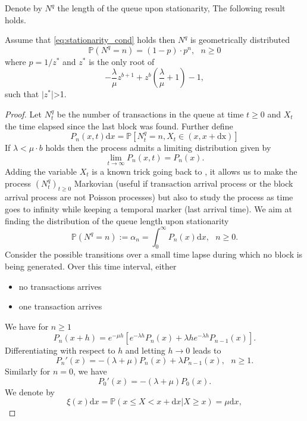 Denote by $N^q$ the length of the queue upon stationarity, The following result holds.
\begin{theo}
Assume that \eqref{eq:stationarity_cond} holds then $N^q$ is geometrically distributed 
$$
\mathbb{P}(N^q = n) = (1-p)\cdot p^n,\text{ } n\geq0
$$
where $p = 1/z^\ast$ and $z^\ast$ is the only root of 
$$
-\frac{\lambda}{\mu}z^{b+1}+z^b\left(\frac{\lambda}{\mu}+1\right) - 1,
$$
such that $|z^\ast$|>1.  
\end{theo}
\begin{proof}
Let $N^q_t$ be the number of transactions in the queue at time $t\geq0$ and $X_t$ the time elapsed since the last block was found. Further define
\[
P_{n}(x,t)\text{d}x  =\mathbb{P}[N_t^q = n, X_t \in(x, x + \text{dx})] 
\]
If $\lambda < \mu\cdot b$ holds then the process admits a limiting distribution given by 
\[
\underset{t\rightarrow\infty}{\lim}P_{n}(x,t) = P_{n}(x).
\]
Adding the variable $X_t$ is a known trick going back to \citet{Cox1955}, it allows us to make the process $(N_t^q)_{t\geq0}$ Markovian (useful if transaction arrival process or the block arrival process are not Poisson processes) but also to study the process as time goes to infinity while keeping a temporal marker (last arrival time). We aim at finding the distribution of the queue length upon stationarity
\begin{equation}\label{eq:alpha_n}
\mathbb{P}(N^q=n):=\alpha_n =\int_{0}^\infty P_{n}(x)\text{d}x, \text{ }n\geq0.
\end{equation}
Consider the possible transitions over a small time lapse  during which no block is being generated. Over this time interval, either 
\begin{itemize}
  \item no transactions arrives
  \item one transaction arrives
\end{itemize}
We have for $n\geq1$
\[
P_{n}(x+h) = e^{-\mu h}\left[e^{-\lambda h}P_{n}(x)+\lambda h e^{-\lambda h}P_{n-1}(x)\right].
\]
Differentiating with respect to $h$ and letting $h\rightarrow0$ leads to 
\begin{equation}\label{eq:diff_eq_n_geq_1}
P_{n}'(x) = -(\lambda+\mu)P_{n}(x)+\lambda P_{n-1}(x),\text{ }n \geq1.
\end{equation}
Similarly for $n = 0$, we have 
\begin{equation}\label{eq:diff_eq_n_eq_0}
P_{0}'(x) = -(\lambda+\mu)P_{0}(x).
\end{equation}
We denote by 
$$
\xi(x)\text{d}x =\mathbb{P}(x\leq X< x+\text{d}x|X\geq x)= \mu\text{d}x,
$$
\end{proof}
